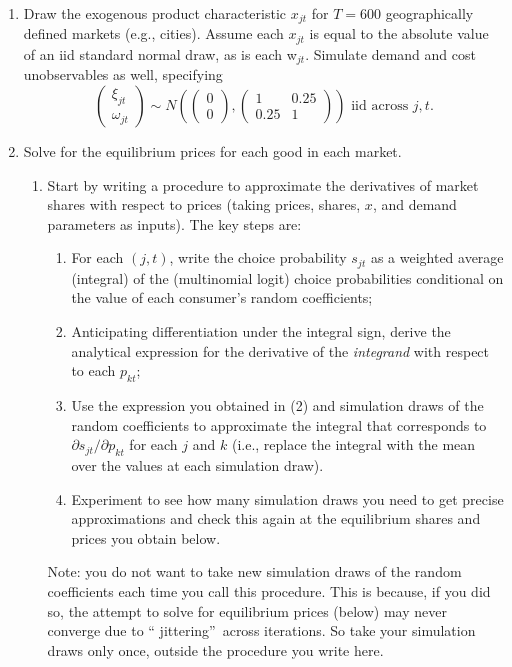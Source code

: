 \documentclass[english,11pt]{article}
\begin{document}
\begin{enumerate}
\item Draw the exogenous product characteristic $x_{jt}$ for $T=600$
geographically defined markets (e.g., cities). Assume each $x_{jt}$ is equal
to the absolute value of an iid standard normal draw, as is each w$_{jt}$.
Simulate demand and cost unobservables as well, specifying
\begin{equation*}
\left(
\begin{array}{c}
\xi _{jt} \\
\omega _{jt}%
\end{array}%
\right) \sim N\left( \left(
\begin{array}{c}
0 \\
0%
\end{array}%
\right) ,\left(
\begin{array}{cc}
1 & 0.25 \\
0.25 & 1%
\end{array}%
\right) \right) \text{ iid across }j,t.
\end{equation*}

\item Solve for the equilibrium prices for each good in each market.

\begin{enumerate}
\item Start by writing a procedure to approximate the derivatives of market
shares with respect to prices (taking prices, shares, $x$, and demand
parameters as inputs). The key steps are:
\begin{enumerate}
\item For each $(j,t)$, write the choice probability $s_{jt}$ as a weighted
average (integral) of the (multinomial logit) choice probabilities
conditional on the value of each consumer's random coefficients;
\item Anticipating differentiation under the integral sign, derive the
analytical expression for the derivative of the \textit{integrand} with
respect to each $p_{kt}$; 
\item Use the expression you obtained in (2) and simulation draws of the
random coefficients to approximate the integral that corresponds to $%
\partial s_{jt}/\partial p_{kt}$ for each $j$ and $k$ (i.e., replace
the integral with the mean over the values at each simulation draw).
\item Experiment to see how many simulation draws you need to get precise
approximations and check this again at the equilibrium shares and prices you
obtain below. \newline
\end{enumerate}
Note: you do not want to take new simulation draws of the random
coefficients each time you call this procedure. This is because,  if you did so, the attempt
to solve for equilibrium prices (below) may never converge due to \textquotedblleft
jittering\textquotedblright\ across iterations. So take your simulation draws only once, outside the procedure you write here. %



\end{enumerate}
\end{enumerate}
\end{document}
